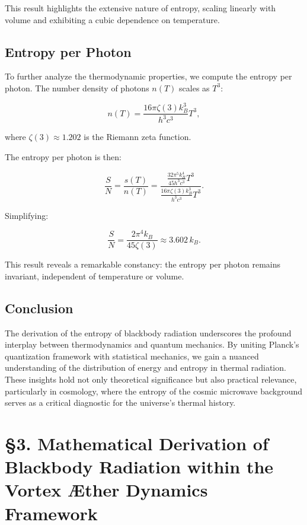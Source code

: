  This result highlights the extensive nature of entropy, scaling linearly with volume and exhibiting a cubic dependence on temperature.

 \subsection*{Entropy per Photon}
 To further analyze the thermodynamic properties, we compute the entropy per photon. The number density of photons $n(T)$ scales as $T^3$:

 \begin{equation*}
  n(T) = \frac{16 \pi \zeta(3) k_B^3}{h^3 c^3} T^3,
 \end{equation*}

 where $\zeta(3) \approx 1.202$ is the Riemann zeta function.

 The entropy per photon is then:

 \begin{equation*}
  \frac{S}{N} = \frac{s(T)}{n(T)} = \frac{\frac{32 \pi^5 k_B^4}{45 h^3 c^3} T^3}{\frac{16 \pi \zeta(3) k_B^3}{h^3 c^3} T^3}.
 \end{equation*}

 Simplifying:

 \begin{equation*}
  \frac{S}{N} = \frac{2 \pi^4 k_B}{45 \zeta(3)} \approx 3.602 \, k_B.
 \end{equation*}

 This result reveals a remarkable constancy: the entropy per photon remains invariant, independent of temperature or volume.

 \subsection*{Conclusion}
 The derivation of the entropy of blackbody radiation underscores the profound interplay between thermodynamics and quantum mechanics. By uniting Planck's quantization framework with statistical mechanics, we gain a nuanced understanding of the distribution of energy and entropy in thermal radiation. These insights hold not only theoretical significance but also practical relevance, particularly in cosmology, where the entropy of the cosmic microwave background serves as a critical diagnostic for the universe's thermal history.



  \section*{§3. Mathematical Derivation of Blackbody Radiation within the Vortex Æther Dynamics Framework}

